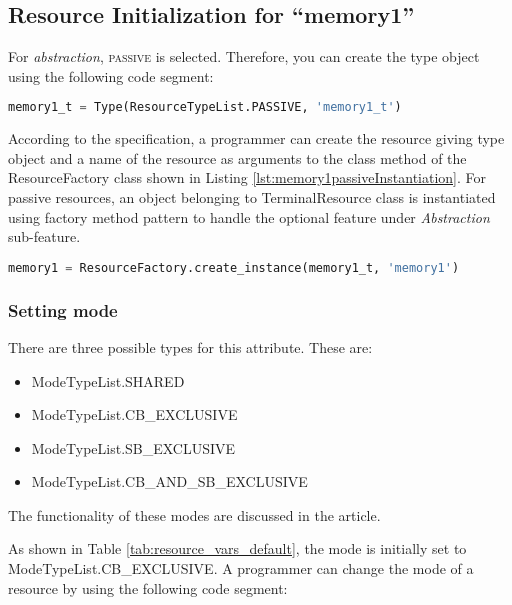 \documentclass[]{scrartcl}
\begin{document}
            
\subsection{Resource Initialization for ``\textsf{memory1}''}
        
For \emph{abstraction}, \textsc{passive} is selected. Therefore, you can create the type object using the following code segment:

\begin{lstlisting}[language=Python, frame=single, label={lst:memory1passiveType}, caption={Passive resource type object instantiation}]
memory1_t = Type(ResourceTypeList.PASSIVE, 'memory1_t')
\end{lstlisting}
        
        
According to the specification, a programmer can create the resource giving type object and a name of the resource as arguments to the class method of the
ResourceFactory class shown in Listing \ref{lst:memory1passiveInstantiation}. For passive resources, an object belonging to \textsf{TerminalResource} class is instantiated
using factory method pattern to handle the optional feature under \emph{Abstraction} sub-feature.


\begin{lstlisting}[language=Python, frame=single, label={lst:memory1passiveInstantiation}, caption={Passive resource instantiation using ResourceFactory class}]
memory1 = ResourceFactory.create_instance(memory1_t, 'memory1')
\end{lstlisting}
        

\subsubsection{Setting mode}
There are three possible types for this attribute. These are:
\begin{itemize}
    \item \textsf{ModeTypeList.SHARED}
    \item \textsf{ModeTypeList.CB\_EXCLUSIVE}
    \item \textsf{ModeTypeList.SB\_EXCLUSIVE}
    \item \textsf{ModeTypeList.CB\_AND\_SB\_EXCLUSIVE}
\end{itemize}
The functionality of these modes are discussed in the article.

As shown in Table \ref{tab:resource_vars_default}, the mode is initially set to \textsf{ModeTypeList.CB\_EXCLUSIVE}. A programmer can change the mode of a resource by using the following code segment:
\end{document}
